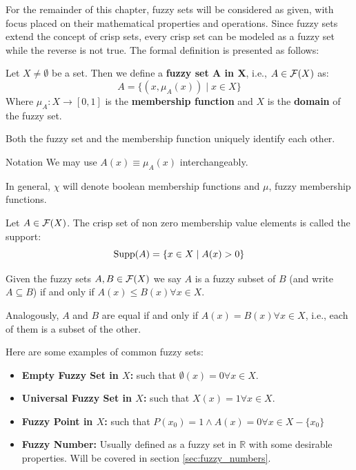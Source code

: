 For the remainder of this chapter, fuzzy sets will be considered as given, with focus placed on their mathematical properties and operations. Since fuzzy sets extend the concept of crisp sets, every crisp set can be modeled as a fuzzy set while the reverse is not true. The formal definition is presented as follows:

\begin{definition}
    Let $X\neq\emptyset$ be a set. Then we define a \textbf{fuzzy set A in X}, i.e., $A \in \mathcal{F}(X)$ as:
    \[A=\{(x,\mu_A(x))\mid x\in X\}\]
    Where $\mu_A:X\longrightarrow [0,1]$ is the \textbf{membership function} and $X$ is the \textbf{domain} of the fuzzy set.
\end{definition}

\begin{remark}
     Both the fuzzy set and the membership function uniquely identify each other.
\end{remark}

\begin{notation}{Notation}
    We may use \( A(x) \equiv \mu_A(x) \) interchangeably.

    In general, $\chi$ will denote boolean membership functions and $\mu$, fuzzy membership functions.
\end{notation}



\begin{definition}[Support]
    Let $A \in \mathcal{F}(X)$. The crisp set of non zero membership value elements is called the support:
    \[\textnormal{Supp}(A)=\{x\in X \mid A(x)>0\}\]
\end{definition}

\begin{definition}
    Given the fuzzy sets $A, B \in \mathcal{F}(X)$ we say $A$ is a fuzzy subset of $B$ (and write $A \subseteq B$) if and only if $A(x)
    \leq B(x) \forall x \in X$.

    Analogously, $A$ and $B$ are equal if and only if $A(x)=B(x) \forall x \in X$, i.e., each of them is a subset of the other.
\end{definition}

\begin{example}
    Here are some examples of common fuzzy sets:
    \begin{itemize}
        \item \textbf{Empty Fuzzy Set in $X$:} such that $\emptyset(x)=0 \forall x \in X$.
        \item \textbf{Universal Fuzzy Set in $X$:} such that $X(x)=1  \forall x \in X$.
        \item \textbf{Fuzzy Point in $X$:} such that $P(x_0)=1 \land A(x)=0 \forall x \in X-\{x_0\}$
        \item \textbf{Fuzzy Number:} Usually defined as a fuzzy set in $\mathbb{R}$ with some desirable properties. Will be covered in section \ref{sec:fuzzy_numbers}.
    \end{itemize}
\end{example}
